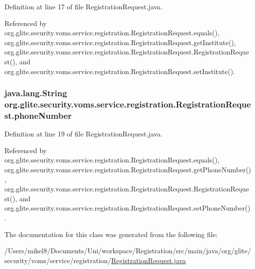 Definition at line 17 of file RegistrationRequest.java.



Referenced by org.glite.security.voms.service.registration.RegistrationRequest.equals(), org.glite.security.voms.service.registration.RegistrationRequest.getInstitute(), org.glite.security.voms.service.registration.RegistrationRequest.RegistrationRequest(), and org.glite.security.voms.service.registration.RegistrationRequest.setInstitute().

\hypertarget{classorg_1_1glite_1_1security_1_1voms_1_1service_1_1registration_1_1RegistrationRequest_a052a5ee4feedb9e29f23cc324067c0a4}{
\subsubsection[{phoneNumber}]{\setlength{\rightskip}{0pt plus 5cm}java.lang.String {\bf org.glite.security.voms.service.registration.RegistrationRequest.phoneNumber}}}
\label{classorg_1_1glite_1_1security_1_1voms_1_1service_1_1registration_1_1RegistrationRequest_a052a5ee4feedb9e29f23cc324067c0a4}


Definition at line 19 of file RegistrationRequest.java.



Referenced by org.glite.security.voms.service.registration.RegistrationRequest.equals(), org.glite.security.voms.service.registration.RegistrationRequest.getPhoneNumber(), org.glite.security.voms.service.registration.RegistrationRequest.RegistrationRequest(), and org.glite.security.voms.service.registration.RegistrationRequest.setPhoneNumber().



The documentation for this class was generated from the following file:\begin{DoxyCompactItemize}
\item 
/Users/mikel8/Documents/Uni/workspace/Registration/src/main/java/org/glite/security/voms/service/registration/\hyperlink{RegistrationRequest_8java}{RegistrationRequest.java}\end{DoxyCompactItemize}
